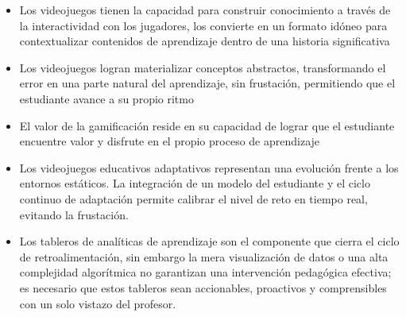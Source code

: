 \begin{itemize}
	\item Los videojuegos tienen la capacidad para construir conocimiento a través de la interactividad con los jugadores, los convierte en un formato idóneo para contextualizar contenidos de aprendizaje dentro de una historia significativa
	
	\item Los videojuegos logran materializar conceptos abstractos, transformando el error en una parte natural del aprendizaje, sin frustación, permitiendo que el estudiante avance a su propio ritmo
	
	\item El valor de la gamificación reside en su capacidad de lograr que el estudiante encuentre valor y disfrute en el propio proceso de aprendizaje
	
	\item Los videojuegos educativos adaptativos representan una evolución frente a los entornos estáticos. La integración de un modelo del estudiante y el ciclo continuo de adaptación permite calibrar el nivel de reto en tiempo real, evitando la frustación.
	
	\item Los tableros de analíticas de aprendizaje son el componente que cierra el ciclo de retroalimentación, sin embargo la mera visualización de datos o una alta complejidad algorítmica no garantizan una intervención pedagógica efectiva; es necesario que estos tableros sean accionables, proactivos y comprensibles con un solo vistazo del profesor.
	
\end{itemize}